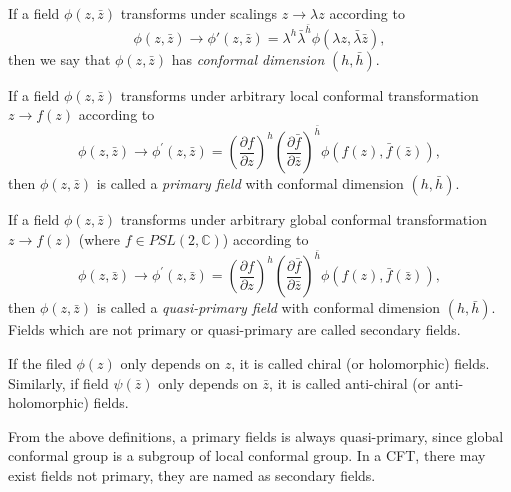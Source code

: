 \documentclass[graybox,envcountchap,sectrefs]{svmono}
\begin{document}
\begin{svgraybox}
\begin{definition}
If a field $\phi(z,\bar{z})$ transforms under scalings $z\to \lambda z$ according to 
\begin{equation}
\phi(z,\bar{z})\to \phi'(z,\bar{z})=\lambda^{h}\bar{\lambda}^{\bar{h}}\phi(\lambda z,\bar{\lambda}\bar{z}),	
\end{equation}
then  we say that $\phi(z,\bar{z})$ has \emph{conformal dimension} $(h,\bar{h})$.

If a field $\phi(z,\bar{z})$ transforms under arbitrary local conformal transformation $z\to f(z)$ according to
\begin{equation}
\phi(z, \bar{z}) \to \phi^{\prime}(z, \bar{z})=\left(\frac{\partial f}{\partial z}\right)^{h}\left(\frac{\partial \bar{f}}{\partial \bar{z}}\right)^{\bar{h}} \phi(f(z), \bar{f}(\bar{z})),	
\end{equation}
then $\phi(z,\bar{z})$ is called a \emph{primary field} with conformal dimension $(h,\bar{h})$.

If a field $\phi(z,\bar{z})$ transforms under arbitrary global conformal transformation $z\to f(z)$ (where $f\in PSL(2,\mathbb{C})$) according to
\begin{equation}
\phi(z, \bar{z}) \to \phi^{\prime}(z, \bar{z})=\left(\frac{\partial f}{\partial z}\right)^{h}\left(\frac{\partial \bar{f}}{\partial \bar{z}}\right)^{\bar{h}} \phi(f(z), \bar{f}(\bar{z})),	
\end{equation}
then $\phi(z,\bar{z})$ is called a \emph{quasi-primary field} with conformal dimension $(h,\bar{h})$. Fields which are not primary or quasi-primary are called secondary fields.

If the filed $\phi(z)$ only depends on $z$, it is called chiral (or holomorphic) fields. Similarly, if field $\psi(\bar{z})$ only depends on $\bar{z}$, it is called anti-chiral (or anti-holomorphic) fields. 
\end{definition}
\end{svgraybox}

From the above definitions, a primary fields is always quasi-primary, since global conformal group is a subgroup of local conformal group.
In a CFT, there may exist fields not primary, they are named as secondary fields.
\end{document}
